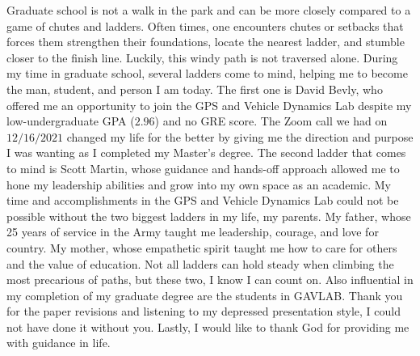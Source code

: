 \documentclass[12pt]{report}
\begin{document}
\begin{romanpages}
  \begin{acknowledgments}
    Graduate school is not a walk in the park and can be more closely compared to a game of chutes and ladders. Often times, one encounters chutes or setbacks that forces them strengthen their foundations, locate the nearest ladder, and stumble closer to the finish line. Luckily, this windy path is not traversed alone. During my time in graduate school, several ladders come to mind, helping me to become the man, student, and person I am today. The first one is David Bevly, who offered me an opportunity to join the GPS and Vehicle Dynamics Lab despite my low-undergraduate GPA (\(2.96\)) and no GRE score. The Zoom call we had on \(12/16/2021\) changed my life for the better by giving me the direction and purpose I was wanting as I completed my Master's degree. The second ladder that comes to mind is Scott Martin, whose guidance and hands-off approach allowed me to hone my leadership abilities and grow into my own space as an academic. My time and accomplishments in the GPS and Vehicle Dynamics Lab could not be possible without the two biggest ladders in my life, my parents. My father, whose 25 years of service in the Army taught me leadership, courage, and love for country. My mother, whose empathetic spirit taught me how to care for others and the value of education. Not all ladders can hold steady when climbing the most precarious of paths, but these two, I know I can count on. Also influential in my completion of my graduate degree are the students in GAVLAB\@. Thank you for the paper revisions and listening to my depressed presentation style, I could not have done it without you. Lastly, I would like to thank God for providing me with guidance in life.
  \end{acknowledgments}


  \begin{singlespace}


\end{singlespace}
\end{romanpages}
\end{document}
